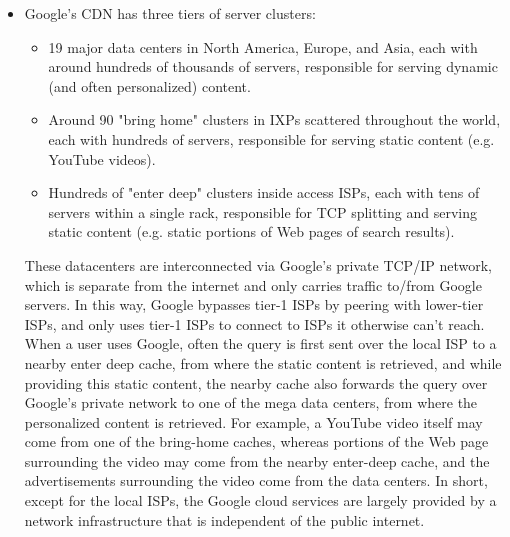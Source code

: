 \documentclass[8pt, table, xcdraw]{article}%
\begin{document}
\begin{itemize}
    \item Google's CDN has three tiers of server clusters:
    \begin{itemize}
        \item 19 major data centers in North America, Europe, and Asia, each with around hundreds of thousands of servers, responsible for serving dynamic (and often personalized) content.
        \item Around 90 "bring home" clusters in IXPs scattered throughout the world, each with hundreds of servers, responsible for serving static content (e.g. YouTube videos).
        \item Hundreds of "enter deep" clusters inside access ISPs, each with tens of servers within a single rack, responsible for TCP splitting and serving static content (e.g. static portions of Web pages of search results).
    \end{itemize}
    
    These datacenters are interconnected via Google’s private TCP/IP network, which is separate from the internet and only carries traffic to/from Google servers. In this way, Google bypasses tier-1 ISPs by peering with lower-tier ISPs, and only uses tier-1 ISPs to connect to ISPs it otherwise can't reach.\\
    When a user uses Google, often the query is first sent over the local ISP to a nearby enter deep cache, from where the static content is retrieved, and while providing this static content, the nearby cache also forwards the query over Google’s private network to one of the mega data centers, from where the personalized content is retrieved. For example, a YouTube video itself may come from one of the bring-home caches, whereas portions of the Web page surrounding the video may come from the nearby enter-deep cache, and the advertisements surrounding the video come from the data centers. In short, except for the local ISPs, the Google cloud services are largely provided by a network infrastructure that is independent of the public internet.
    

\end{itemize}
\end{document}
